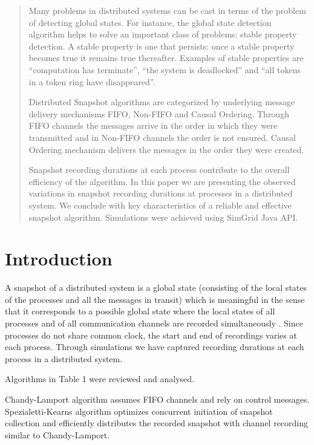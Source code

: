\documentclass[12pt]{article}
\begin{document}
\maketitle

\begin{abstract}
Many problems in distributed systems can be cast in terms of the problem of detecting global states. For instance, the global state detection algorithm helps to solve an important class of problems: stable property detection. A stable property is one that persists: once a stable property becomes true it remains true thereafter. Examples of stable properties are ``computation has terminate'', ``the system is deadlocked'' and ``all tokens in a token ring have disappeared''.  \cite{cl:seminal}

Distributed Snapshot algorithms are categorized by underlying message delivery mechanisms FIFO, Non-FIFO and Causal Ordering. Through FIFO channels the messages arrive in the order in which they were transmitted and in Non-FIFO channels the order is not ensured. Causal Ordering mechanism delivers the messages in the order they were created. 

Snapshot recording durations at each process contribute to the overall efficiency of the algorithm. In this paper we are presenting the observed variations in snapshot recording durations at processes in a distributed system.  We conclude with key characteristics of a reliable and effective snapshot algorithm. Simulations were achieved using SimGrid Java API.
\end{abstract}

\section{Introduction}
A snapshot of a distributed system is a global state (consisting of the local states of the processes and all the messages in transit) which is meaningful in the sense that it corresponds to a possible global state where the local states of all processes and of all communication channels are recorded simultaneously 	\cite{mat:vclks}. Since processes do not share common clock, the start and end of recordings varies at each process. Through simulations we have captured recording durations at each process in a distributed system. 

Algorithms in Table 1 were reviewed and analysed.

Chandy-Lamport algorithm assumes FIFO channels and rely on control messages. Spezialetti-Kearns algorithm optimizes concurrent initiation of snapshot collection and efficiently distributes the recorded snapshot with channel recording similar to Chandy-Lamport.
\end{document}
